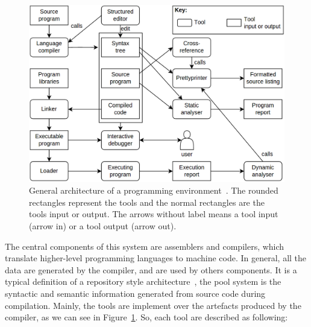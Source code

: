 \begin{figure}[!htbp]
  \centering
  \includegraphics[scale=0.2]{img/pwb}
    \caption{General architecture of a programming environment~\cite{sommerville1996software}. The rounded rectangles represent the tools and the normal rectangles are the tools input or output. The  arrows without label means a tool input (arrow in) or a tool output (arrow out).}
  \label{fig:pwd}
\end{figure}

The central components of this system are assemblers and compilers, which translate higher-level programming languages to machine code. In general, all the data are generated by the compiler, and are used by others components. It is a typical definition of a repository style architecture~\cite[chap.~4.5]{clements2002documenting}, the pool system is the syntactic and semantic information generated from source code during compilation. Mainly, the tools are implement over the artefacts produced by the compiler, as we can see in Figure~\ref{fig:pwd}. So, each tool are described as following:

